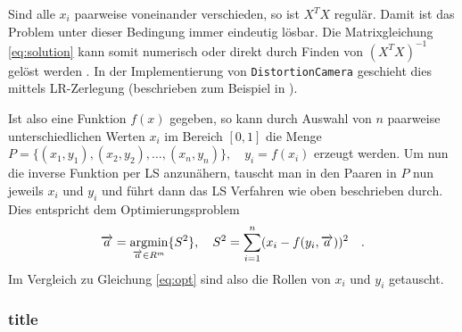 Sind alle $x_i$ paarweise voneinander verschieden, so ist $X^T X$ regulär. Damit ist das Problem unter dieser Bedingung immer eindeutig lösbar. Die Matrixgleichung \ref{eq:solution} kann somit numerisch oder direkt durch Finden von $(X^T X)^{-1}$ gelöst werden \cite{lsq_poly_wolfram}. In der Implementierung von \texttt{DistortionCamera} geschieht dies mittels LR-Zerlegung (beschrieben zum Beispiel in \cite{bronstein}).

Ist also eine Funktion $f(x)$ gegeben, so kann durch Auswahl von $n$ paarweise unterschiedlichen Werten $x_i$ im Bereich $[0,1]$ die Menge $P = \{ (x_1, y_1), (x_2, y_2), \dots, (x_n, y_n) \}, \quad y_i = f(x_i)$ erzeugt werden. Um nun die inverse Funktion per LS anzunähern, tauscht man in den Paaren in $P$ nun jeweils $x_i$ und $y_i$ und führt dann das LS Verfahren wie oben beschrieben durch. Dies entspricht dem Optimierungsproblem
\begin{equation}
\begin{split}
\overrightarrow{a} = \mathop{\mathrm{argmin}}_{\overrightarrow{a} \in R^m} \{ S^2 \}, \quad
S^2 =  \sum_{i=1}^{n} (x_i - f(y_i, \overrightarrow{a}))^2\quad.
\end{split}
\end{equation}
Im Vergleich zu Gleichung \ref{eq:opt} sind also die Rollen von $x_i$ und $y_i$ getauscht.

\subsubsection{title}